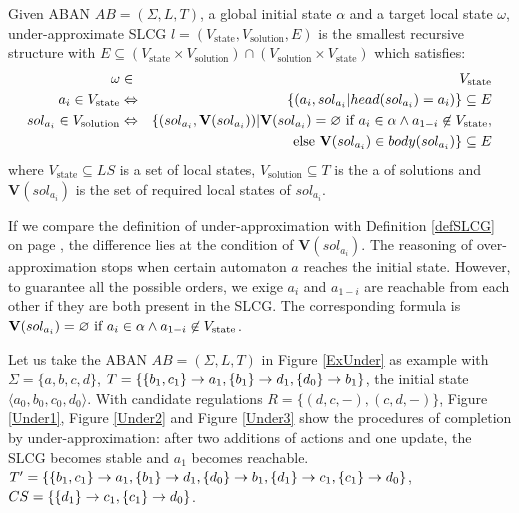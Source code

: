 \begin{definition}
Given ABAN $AB = (\Sigma,L,T)$, a global initial state $\alpha$ and a target local state $\omega$, under-approximate SLCG $l= (V_{\mathrm{state}},V_{\mathrm{solution}},E)$ is the smallest recursive structure with $E \subseteq (V_{\mathrm{state}}\times V_{\mathrm{solution}})\cap (V_{\mathrm{solution}}\times V_{\mathrm{state}})$ which satisfies:
\begin{eqnarray*}
    \omega&\in& V_{\mathrm{state}} \\
    a_i\in V_{\mathrm{state}} &\Leftrightarrow& \{ (a_i, sol_{a_i}| head(sol_{a_i})=a_i)\}\subseteq E \\
    sol_{a_i}\in V_{\mathrm{solution}}&\Leftrightarrow& \{ (sol_{a_i},\mathbf{V}(sol_{a_i}))| \mathbf{V}(sol_{a_i})=\varnothing \text{ \rm if } a_i\in \alpha\land a_{1-i}\not\in V_{\mathrm{state}},\\
    &&\text{ \rm else }\mathbf{V}(sol_{a_i})\in body(sol_{a_i}) \}\subseteq E
\end{eqnarray*}
where $V_{\mathrm{state}}\subseteq LS$ is a set of local states, $V_{\mathrm{solution}}\subseteq T$ is the a of solutions and $\mathbf{V}(sol_{a_i})$ is the set of required local states of $sol_{a_i}$. 
\end{definition}

If we compare the definition of under-approximation with Definition \ref{defSLCG} on page \pageref{defSLCG}, the difference lies at the condition of $\mathbf{V}(sol_{a_i})$. 
The reasoning of over-approximation stops when certain automaton $a$ reaches the initial state. 
However, to guarantee all the possible orders, we exige $a_i$ and $a_{1-i}$ are reachable from each other if they are both present in the SLCG.
The corresponding formula is $\mathbf{V}(sol_{a_i})=\varnothing \text{ \rm if } a_i\in \alpha\land a_{1-i}\not\in V_{\mathrm{state}}$.

Let us take the ABAN $AB=(\Sigma, L, T)$ in Figure \ref{ExUnder} as example with $\Sigma= \{a,b,c,d\}$, $T=\{\acm{b_1,c_1}{a_0}{a_1}, \acm{b_1}{d_0}{d_1}, \acm{d_0}{b_0}{b_1}\}$, the initial state $\langle a_0,b_0,c_0,d_0\rangle$.
With candidate regulations $R=\{(d,c,-),(c,d,-)\}$, Figure \ref{Under1}, Figure \ref{Under2} and Figure \ref{Under3} show the procedures of completion by under-approximation: after two additions of actions and one update, the SLCG becomes stable and $a_1$ becomes reachable.
$T'=\{\acm{b_1,c_1}{a_0}{a_1}, \acm{b_1}{d_0}{d_1}, \acm{d_0}{b_0}{b_1},\acm{d_1}{c_0}{c_1}, \acm{c_1}{d_1}{d_0}\}$, $CS=\{\acm{d_1}{c_0}{c_1}, \acm{c_1}{d_1}{d_0}\}$.

